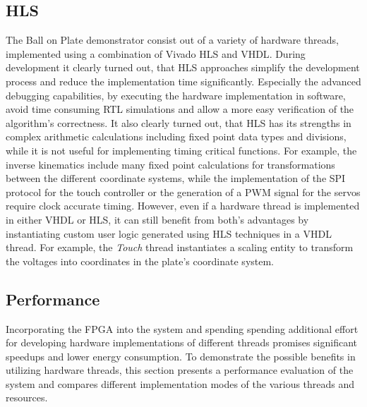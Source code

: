\subsection{\acl{HLS}}
The Ball on Plate demonstrator consist out of a variety of hardware threads,
implemented using a combination of Vivado HLS and \ac{VHDL}. During
development it clearly turned out, that \ac{HLS} approaches simplify the
development process and reduce the implementation time significantly.
Especially the advanced debugging capabilities, by executing the hardware
implementation in software, avoid time consuming \ac{RTL} simulations and
allow a more easy verification of the algorithm's correctness. It also clearly
turned out, that \ac{HLS} has its strengths in complex arithmetic calculations
including fixed point data types and divisions, while it is not useful for
implementing timing critical functions. For example, the inverse kinematics
include many fixed point calculations for transformations between the
different coordinate systems, while the implementation of the \ac{SPI}
protocol for the touch controller or the generation of a \ac{PWM} signal for
the servos require clock accurate timing. However, even if a hardware thread
is implemented in either \ac{VHDL} or \ac{HLS}, it can still benefit from
both's advantages by instantiating custom user logic generated using \ac{HLS}
techniques in a \ac{VHDL} thread. For example, the \emph{Touch} thread
instantiates a scaling entity to transform the voltages into coordinates in
the plate's coordinate system.

\subsection{Performance}
Incorporating the \ac{FPGA} into the system and spending spending additional
effort for developing hardware implementations of different threads promises
significant speedups and lower energy consumption. To demonstrate the possible
benefits in utilizing hardware threads, this section presents a performance
evaluation of the system and compares different implementation modes of the
various threads and resources.

